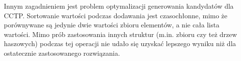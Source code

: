 Innym zagadnieniem jest problem optymalizacji generowania kandydatów dla CCTP. Sortowanie wartości podczas dodawania jest czasochłonne, mimo że porównywane są jedynie dwie wartości zbioru elementów, a nie cała lista wartości. Mimo prób zastosowania innych struktur (m.in. zbioru czy też drzew haszowych) podczas tej operacji nie udało się uzyskać lepszego wyniku niż dla ostatecznie zastosowanego rozwiązania. 